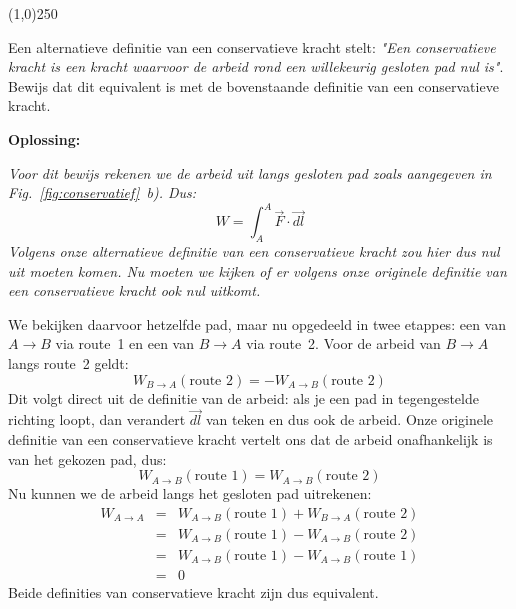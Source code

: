 \begin{center}
\line(1,0){250}
\end{center}
\begin{voorbeeld} \label{ex:cons1}
Een alternatieve definitie van een conservatieve kracht stelt: {\it"Een conservatieve kracht is een 
kracht waarvoor de arbeid rond een willekeurig gesloten pad nul is"}. Bewijs dat dit equivalent
is met de bovenstaande definitie van een conservatieve kracht.

{\bf Oplossing: }{\it Voor dit bewijs rekenen we de arbeid uit langs gesloten pad zoals aangegeven
in Fig.~\ref{fig:conservatief}~b). Dus:
\begin{equation}
W=\int_A^A \vec{F}\cdot\vec{d l}
\end{equation}
Volgens onze alternatieve definitie van een conservatieve kracht zou hier dus nul uit moeten 
komen.  Nu moeten we kijken of er volgens onze originele definitie van een conservatieve kracht 
ook nul uitkomt.

We bekijken daarvoor hetzelfde pad, maar nu opgedeeld in twee etappes: een van $A\rightarrow B$ via 
route~1 en een van $B\rightarrow A$ via route~2. Voor de arbeid van $B\rightarrow A$ langs route~2  
geldt:
\begin{equation}
W_{B\rightarrow A}(\mbox{route~2}) = -W_{A\rightarrow B}(\mbox{route~2})
\end{equation}
Dit volgt direct uit de definitie van de arbeid: als je een pad in tegengestelde richting loopt, dan
verandert $\vec{d l}$ van teken en dus ook de arbeid. Onze originele definitie van een
conservatieve kracht vertelt ons dat de arbeid onafhankelijk is van het gekozen pad, dus:
\begin{equation}
W_{A\rightarrow B}(\mbox{route~1})= W_{A\rightarrow B}(\mbox{route~2})
\end{equation}
Nu kunnen we de arbeid langs het gesloten pad uitrekenen:
\begin{eqnarray}
W_{A\rightarrow A} & = & W_{A\rightarrow B}(\mbox{route 1}) + W_{B\rightarrow A}(\mbox{route~2}) \\
                                   &= & W_{A\rightarrow B}(\mbox{route 1})  - W_{A\rightarrow B}(\mbox{route~2}) \\
                                   & = & W_{A\rightarrow B}(\mbox{route 1})  - W_{A\rightarrow B}(\mbox{route~1}) \\
                                   & = & 0
\end{eqnarray}
Beide definities van conservatieve kracht zijn dus equivalent.
}
\end{voorbeeld}
